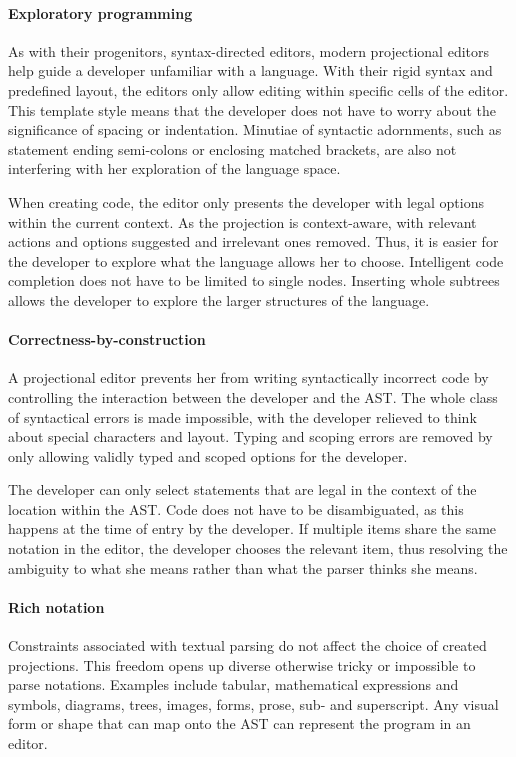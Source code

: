  
\paragraph{Exploratory programming}
As with their progenitors, syntax-directed editors, modern projectional editors help guide a developer unfamiliar with a language.
With their rigid syntax and predefined layout, the editors only allow editing within specific cells of the editor.
This template style means that the developer does not have to worry about the significance of spacing or indentation.
Minutiae of syntactic adornments, such as statement ending semi-colons or enclosing matched brackets, are also not interfering with her exploration of the language space.

When creating code, the editor only presents the developer with legal options within the current context.
As the projection is context-aware, with relevant actions and options suggested and irrelevant ones removed.
Thus, it is easier for the developer to explore what the language allows her to choose.
Intelligent code completion does not have to be limited to single nodes.
Inserting whole subtrees allows the developer to explore the larger structures of the language.

\paragraph{Correctness-by-construction}
A projectional editor prevents her from writing syntactically incorrect code by controlling the interaction between the developer and the AST.
The whole class of syntactical errors is made impossible, with the developer relieved to think about special characters and layout.
Typing and scoping errors are removed by only allowing validly typed and scoped options for the developer.

The developer can only select statements that are legal in the context of the location within the AST.
Code does not have to be disambiguated, as this happens at the time of entry by the developer.
If multiple items share the same notation in the editor, the developer chooses the relevant item, thus resolving the ambiguity to what she means rather than what the parser thinks she means.

\paragraph{Rich notation}
Constraints associated with textual parsing do not affect the choice of created projections. 
This freedom opens up diverse otherwise tricky or impossible to parse notations.
Examples include tabular, mathematical expressions and symbols, diagrams, trees, images, forms, prose, sub- and superscript.
Any visual form or shape that can map onto the AST can represent the program in an editor.

